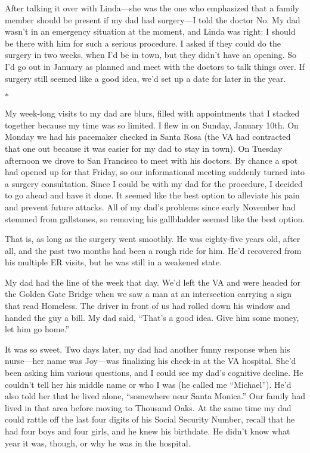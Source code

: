 \documentclass[12pt]{book}
\begin{document}
After talking it over with Linda---she was the one who emphasized that a family member should be present if my dad had surgery---I told the doctor No. My dad wasn't in an emergency situation at the moment, and Linda was right: I should be there with him for such a serious procedure. I asked if they could do the surgery in two weeks, when I'd be in town, but they didn't have an opening. So I'd go out in January as planned and meet with the doctors to talk things over. If surgery still seemed like a good idea, we'd set up a date for later in the year.

\begin{center}$*$\end{center}

My week-long visits to my dad are blurs, filled with appointments that I stacked together because my time was so limited. I flew in on Sunday, January 10th. On Monday we had his pacemaker checked in Santa Rosa (the VA had contracted that one out because it was easier for my dad to stay in town). On Tuesday afternoon we drove to San Francisco to meet with his doctors. By chance a spot had opened up for that Friday, so our informational meeting suddenly turned into a surgery consultation. Since I could be with my dad for the procedure, I decided to go ahead and have it done. It seemed like the best option to alleviate his pain and prevent future attacks. All of my dad's problems since early November had stemmed from gallstones, so removing his gallbladder seemed like the best option.

That is, as long as the surgery went smoothly. He was eighty-five years old, after all, and the past two months had been a rough ride for him. He'd recovered from his multiple ER visits, but he was still in a weakened state.

My dad had the line of the week that day. We'd left the VA and were headed for the Golden Gate Bridge when we saw a man at an intersection carrying a sign that read Homeless. The driver in front of us had rolled down his window and handed the guy a bill. My dad said, ``That's a good idea. Give him some money, let him go home.''

It was so sweet. Two days later, my dad had another funny response when his nurse---her name was Joy---was finalizing his check-in at the VA hospital. She'd been asking him various questions, and I could see my dad's cognitive decline. He couldn't tell her his middle name or who I was (he called me ``Michael''). He'd also told her that he lived alone, ``somewhere near Santa Monica.'' Our family had lived in that area before moving to Thousand Oaks. At the same time my dad could rattle off the last four digits of his Social Security Number, recall that he had four boys and four girls, and he knew his birthdate. He didn't know what year it was, though, or why he was in the hospital.
\end{document}
